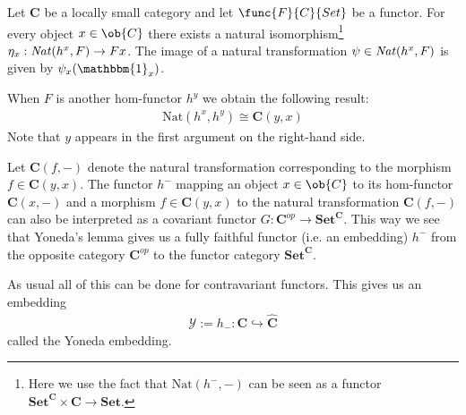     \begin{theorem}
        Let $\mathbf{C}$ be a locally small category and let $\func{F}{C}{Set}$ be a functor. For every object $x\in\ob{C}$ there exists a natural isomorphism\footnote{Here we use the fact that $\text{Nat}(h^-, -)$ can be seen as a functor $\mathbf{Set}^{\mathbf{C}}\times\mathbf{C}\rightarrow\mathbf{Set}$.} $\eta_x:\text{\emph{Nat}}(h^x, F)\rightarrow Fx$. The image of a natural transformation $\psi\in\text{\emph{Nat}}(h^x, F)$ is given by $\psi_x(\mathbbm{1}_x)$.
    \end{theorem}

    \begin{result}
        When $F$ is another hom-functor $h^y$ we obtain the following result:
        \begin{gather}
            \text{Nat}(h^x, h^y)\cong\mathbf{C}(y, x)
        \end{gather}
        Note that $y$ appears in the first argument on the right-hand side.

        Let $\mathbf{C}(f, -)$ denote the natural transformation corresponding to the morphism $f\in\mathbf{C}(y,x)$. The functor $h^-$ mapping an object $x\in\ob{C}$ to its hom-functor $\mathbf{C}(x, -)$ and a morphism $f\in\mathbf{C}(y, x)$ to the natural transformation $\mathbf{C}(f, -)$ can also be interpreted as a covariant functor $G:\mathbf{C}^{op}\rightarrow\mathbf{Set}^{\mathbf{C}}$. This way we see that Yoneda's lemma gives us a fully faithful functor (i.e. an embedding) $h^-$ from the opposite category $\mathbf{C}^{op}$ to the functor category $\mathbf{Set}^{\mathbf{C}}$.

        As usual all of this can be done for contravariant functors. This gives us an embedding
        \begin{gather}
            \mathcal{Y}:=h_-:\mathbf{C}\hookrightarrow\widehat{\mathbf{C}}
        \end{gather}
        called the Yoneda embedding.
    \end{result}


